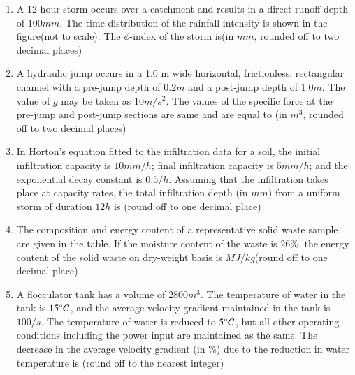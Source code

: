 \documentclass[journal]{IEEEtran}
\begin{document}
\begin{enumerate}
	\item
	A 12-hour storm occurs over a catchment and results in a direct runoff depth of $100 mm$. The time-distribution of the rainfall intensity is shown in the figure(not to scale). The $\phi$-index of the storm is(in $mm$, rounded off to two decimal places)
	\item
	A hydraulic jump occurs in a 1.0 m wide horizontal, frictionless, rectangular channel with a pre-jump depth of $0.2 m$ and a post-jump depth of $1.0 m$. The value of $g$ may be taken as $10 m/s^2$. The values of the specific force at the pre-jump and post-jump sections are same and are equal to (in $m^3$, rounded off to two decimal places)
	\item
	In Horton's equation fitted to the infiltration data for a soil, the initial infiltration capacity is $10 mm/h$; final infiltration capacity is $5 mm/h$; and the exponential decay constant is $0.5 /h$. Assuming that the infiltration takes place at capacity rates, the total infiltration depth (in $mm$) from a uniform storm of duration $12 h$ is (round off to one decimal place)
	\item
	The composition and energy content of a representative solid waste sample are given in the table. If the moisture content of the waste is $26 \%$, the energy content of the solid waste on dry-weight basis is $MJ/kg$(round off to one decimal place)
	\item
	A flocculator tank has a volume of $2800 m^3$. The temperature of water in the tank is $15 \degree C$, and the average velocity gradient maintained in the tank is $100/s$. The temperature of water is reduced to $5 \degree C$, but all other operating conditions including the power input are maintained as the same. The decrease in the average velocity gradient (in \%) due to the reduction in water temperature is (round off to the nearest integer)\\
\end{enumerate}	
\end{document}
